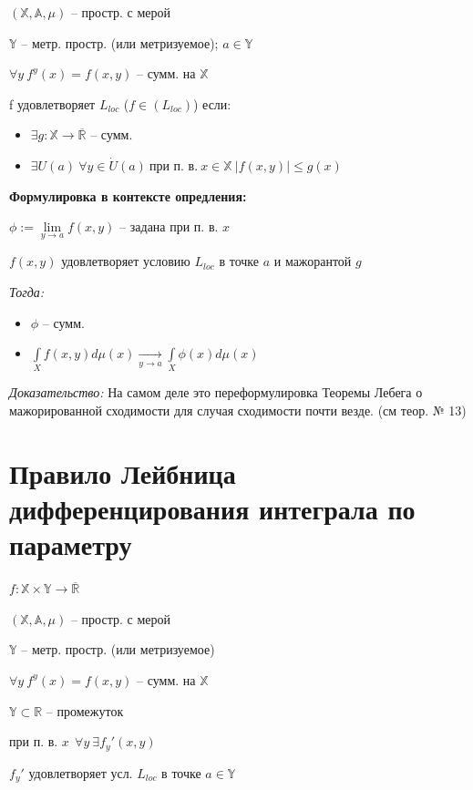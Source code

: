 \documentclass[paper=a4, fontsize=17pt]{article}
\begin{document}
$ (\mathbb{X}, \mathbb{A}, \mu) $ -- простр. с мерой

$ \mathbb{Y} $ -- метр. простр. (или метризуемое); $ a \in \mathbb{Y} $


$ \forall y ~ f^y(x) = f(x, y) $ -- сумм. на $ \mathbb{X} $

f удовлетворяет $ L_{loc} $ ($ f \in (L_{loc}) $) если:
\begin{itemize}
	\item  $ \exists g : \mathbb{X} \rightarrow \overline{\mathbb{R}} $ -- сумм.
	\item $ \exists U(a) ~ \forall y \in \dot{U} (a) ~ \text{при п. в.} ~ x \in \mathbb{X} ~ |f(x, y)| \leq g(x)$
\end{itemize}
\textbf{Формулировка в контексте опредления:}

$ \phi := \lim\limits_{y \rightarrow a} f(x, y) $ -- задана при п. в. $ x $

$ f(x,y) $ удовлетворяет условию $ L_{loc} $ в точке $ a $ и мажорантой $ g $


\emph{Тогда:}

\begin{itemize}
	\item $ \phi $ -- сумм.
	\item $ \int\limits_{X} f(x, y) d\mu (x) \underset{y \rightarrow a}{\longrightarrow} \int\limits_{X} \phi(x) d\mu(x) $
\end{itemize}

\emph{Доказательство:} На самом деле это переформулировка Теоремы Лебега о мажорированной сходимости для случая сходимости почти везде. (см теор. № 13)

\section{Правило Лейбница дифференцирования интеграла по параметру}

$ f : \mathbb{X} \times \mathbb{Y} \rightarrow \overline{\mathbb{R}}$

$ (\mathbb{X}, \mathbb{A}, \mu) $ -- простр. с мерой

$ \mathbb{Y} $ -- метр. простр. (или метризуемое)

$ \forall y ~ f^y(x) = f(x, y) $ -- сумм. на $ \mathbb{X} $

\bigskip

$ \mathbb{Y} \subset \mathbb{R} $ -- промежуток

при п. в. $ x ~~ \forall y ~ \exists f_y'(x, y)$

$ f_y' $ удовлетворяет усл. $ L_{loc} $ в точке $ a \in \mathbb{Y}$
\end{document}
